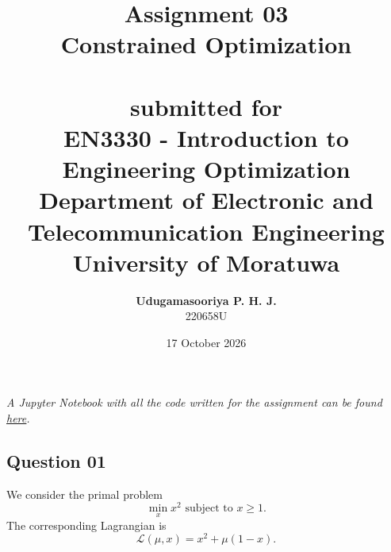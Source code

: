 \documentclass{article}[a4paper]
\title{
	\huge{\textbf{
		Assignment 03
	}}\\
	\Large{
		Constrained Optimization
	}\\
	\large{\phantom{}}\\
	\large{
		submitted for
	}\\
	\Large{
		\textbf{EN3330 - Introduction to Engineering Optimization}
	}\\
	\large{
		Department of Electronic and Telecommunication Engineering
	}
	\\
	\large{University of Moratuwa}
}
\author{
	\textbf{Udugamasooriya P. H. J.}\\
	220658U
}
\date{17 October 2026}
\begin{document}
	\maketitle

    \textit{A Jupyter Notebook with all the code written for the assignment can be found \href{https://github.com/pulasthi-u/en3330-assignment03/blob/master/code.ipynb}{\underline{here}}.}

    \subsection*{Question 01}

    We consider the primal problem \[
        \min_{x} x^2 \text{ subject to } x \geq 1.
    \] The corresponding Lagrangian is \[
        \mathcal{L} \left( \mu, x \right)
        =
        x^2 + \mu \left( 1 - x \right).
    \]
\end{document}
